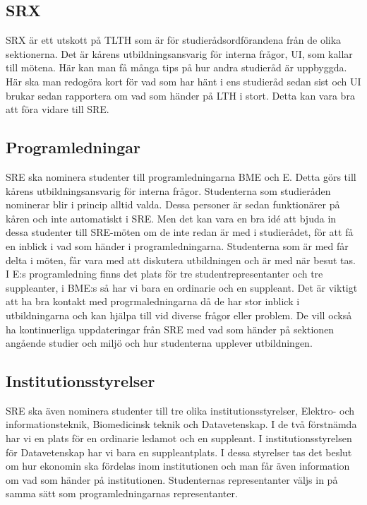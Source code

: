 \documentclass[10pt]{article}
\begin{document}
\subsection{SRX}
SRX är ett utskott på TLTH som är för studierådsordförandena från de olika sektionerna. Det är kårens utbildningsansvarig för interna frågor, UI, som kallar till mötena. Här kan man få många tips på hur andra studieråd är uppbyggda. Här ska man redogöra kort för vad som har hänt i ens studieråd sedan sist och UI brukar sedan rapportera om vad som händer på LTH i stort. Detta kan vara bra att föra vidare till SRE.

\subsection{Programledningar}
SRE ska nominera studenter till programledningarna BME och E. Detta görs till kårens utbildningsansvarig för interna frågor. Studenterna som studieråden nominerar blir i princip alltid valda. Dessa personer är sedan funktionärer på kåren och inte automatiskt i SRE. Men det kan vara en bra idé att bjuda in dessa studenter till SRE-möten om de inte redan är med i studierådet, för att få en inblick i vad som händer i programledningarna. Studenterna som är med får delta i möten, får vara med att diskutera utbildningen och är med när besut tas. I E:s programledning finns det plats för tre studentrepresentanter och tre suppleanter, i BME:s så har vi bara en ordinarie och en suppleant. Det är viktigt att ha bra kontakt med progrmaledningarna då de har stor inblick i utbildningarna och kan hjälpa till vid diverse frågor eller problem. De vill också ha kontinuerliga uppdateringar från SRE med vad som händer på sektionen angående studier och miljö och hur studenterna upplever utbildningen.

\subsection{Institutionsstyrelser}
SRE ska även nominera studenter till tre olika institutionsstyrelser, Elektro- och informationsteknik, Biomedicinsk teknik och Datavetenskap. I de två förstnämda har vi en plats för en ordinarie ledamot och en suppleant. I institutionsstyrelsen för Datavetenskap har vi bara en suppleantplats. I dessa styrelser tas det beslut om hur ekonomin ska fördelas inom institutionen och man får även information om vad som händer på institutionen. Studenternas representanter väljs in på samma sätt som programledningarnas representanter.
\end{document}
